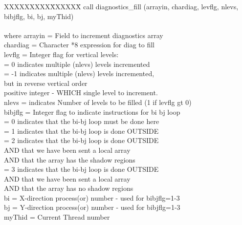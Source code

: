 \noindent
\begin{tabbing}
XXXXXXXXX\=XXXXXX\= \kill
\>        call diagnostics\_fill (arrayin, chardiag, levflg, nlevs, \\
\>              bibjflg, bi, bj, myThid) \\
\\
where \>  arrayin  \>= Field to increment diagnostics array \\
      \>  chardiag \>= Character *8 expression for diag to fill \\
      \>  levflg   \>= Integer flag for vertical levels: \\
      \>           \>= 0 indicates multiple (nlevs) levels incremented \\
      \>           \>= -1 indicates multiple (nlevs) levels incremented, \\
      \>           \> but in reverse vertical order \\
      \>           \> positive integer - WHICH single level to increment. \\
      \>  nlevs    \>= indicates Number of levels to be filled (1 if levflg gt 0) \\
      \>  bibjflg  \>= Integer flag to indicate instructions for bi bj loop \\
      \>           \>= 0 indicates that the bi-bj loop must be done here \\
      \>           \>= 1 indicates that the bi-bj loop is done OUTSIDE \\
      \>           \>= 2 indicates that the bi-bj loop is done OUTSIDE \\
      \>           \>    AND that we have been sent a local array \\
      \>           \>    AND that the array has the shadow regions \\
      \>           \>= 3 indicates that the bi-bj loop is done OUTSIDE \\
      \>           \>    AND that we have been sent a local array \\
      \>           \>    AND that the array has no shadow regions \\
      \>  bi       \>= X-direction process(or) number - used for bibjflg=1-3 \\
      \>  bj       \>= Y-direction process(or) number - used for bibjflg=1-3 \\
      \>  myThid   \>= Current Thread number \\
\end{tabbing}

